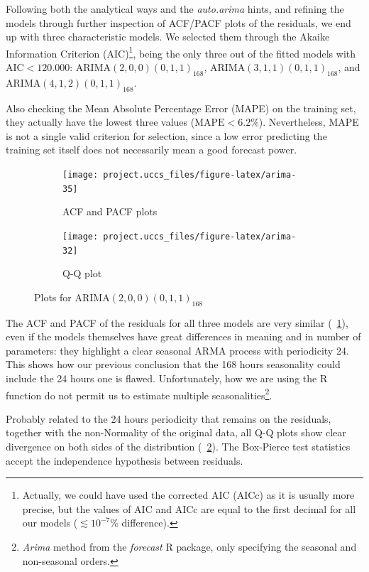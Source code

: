 \documentclass[12pt]{article}
\begin{document}
Following both the analytical ways and the \textit{auto.arima} hints, and refining the models through further inspection of ACF/PACF plots of the residuals, we end up with three characteristic models. We selected them through the Akaike Information Criterion (AIC)\footnote{Actually, we could have used the corrected AIC (AICc) as it is usually more precise, but the values of AIC and AICc are equal to the first decimal for all our models ($\lesssim 10^{-7}\%$ difference).}, being the only three out of the fitted models with $\mathrm{AIC} < 120.000$: $\mathrm{ARIMA}(2,0,0)(0,1,1)_{168}$, $\mathrm{ARIMA}(3,1,1)(0,1,1)_{168}$, and $\mathrm{ARIMA}(4,1,2)(0,1,1)_{168}$.

Also checking the Mean Absolute Percentage Error (MAPE) on the training set, they actually have the lowest three values ($\mathrm{MAPE} < 6.2\%$). Nevertheless, MAPE is not a single valid criterion for selection, since a low error predicting the training set itself does not necessarily mean a good forecast power.

\begin{figure}[h]
	\begin{subfigure}{.5\linewidth}
		\texttt{[image: project.uccs\_files/figure-latex/arima-35]}
		\caption{ACF and PACF plots}
		\label{fig:arima-26}
	\end{subfigure}
	\begin{subfigure}{.5\linewidth}
		\texttt{[image: project.uccs\_files/figure-latex/arima-32]}
		\caption{Q-Q plot}
		\label{fig:arima-24}
	\end{subfigure}
	\caption{Plots for $\mathrm{ARIMA}(2,0,0)(0,1,1)_{168}$}
	\label{fig:arima}
\end{figure}
%
The ACF and PACF of the residuals for all three models are very similar (\figurename~\ref{fig:arima-26}), even if the models themselves have great differences in meaning and in number of parameters: they highlight a clear seasonal ARMA process with periodicity 24. This shows how our previous conclusion that the 168 hours seasonality could include the 24 hours one is flawed. Unfortunately, how we are using the R function do not permit us to estimate multiple seasonalities\footnote{\textit{Arima} method from the \textit{forecast} R package, only specifying the seasonal and non-seasonal orders.}.

Probably related to the 24 hours periodicity that remains on the residuals, together with the non-Normality of the original data, all Q-Q plots show clear divergence on both sides of the distribution (\figurename~\ref{fig:arima-24}). The Box-Pierce test statistics accept the independence hypothesis between residuals.
\end{document}
